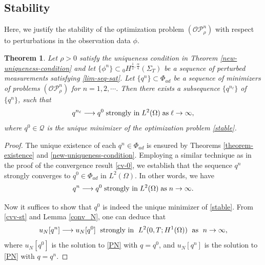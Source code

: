\documentclass[a4paper,12pt,reqno,natbib]{amsart}
\newtheorem{theorem}{Theorem}
\begin{document}
{\color{black}
\subsection{\bf Stability}
Here, we justify the stability of the optimization problem $(\mathcal{O}\mathcal{P}_\rho^n)$ with respect to perturbations in the observation data $\phi$.

\begin{theorem} Let $\rho>0$ satisfy the uniqueness condition in Theorem \ref{new-uniqueness-condition} and let $\{\phi^n\} \subset {}_0H^{\frac{1}{2},\frac{\alpha}{4}}(\Sigma_T)$ be a sequence of perturbed measurements satisfying \eqref{lim-seq-sat}. Let $\{ q^n \}\subset\Phi_{ad}$ be a sequence of minimizers of problems $(\mathcal{O}\mathcal{P}_{\rho}^n)$ for $n=1,2,\cdots$. Then there exists a subsequence $\{ q^{n_\ell} \}$ of $\{ q^n \}$, such that 
\begin{equation*}
q^{n_\ell}\longrightarrow q^0\; \hbox{strongly in}\; L^2(\Omega)\; \hbox{as}\; \ell\rightarrow\infty,
\end{equation*}
where $q^0\in\mathcal{Q}$ is the unique minimizer of the optimization problem \eqref{stable}.
\end{theorem}

\begin{proof}
The unique existence of each $q^n\in\Phi_{ad}$ is ensured by Theorems \ref{theorem-existence} and \ref{new-uniqueness-condition}. Employing a similar technique as in the proof of the convergence result \eqref{cv-0}, we establish that the sequence $q^n$ strongly converges to $q^0\in\Phi_{ad}$ in $L^2(\Omega)$. In other words, we have
\begin{equation}\label{cvv-st}
q^n\longrightarrow q^0\; \hbox{strongly in}\; L^2(\Omega)\; \hbox{as}\; n\rightarrow\infty.
\end{equation}


Now it suffices to show that $q^0$ is indeed the unique minimizer of \eqref{stable}. From \eqref{cvv-st} and Lemma \ref{conv_N}, one can deduce that 
\begin{equation} \label{convergancefaible-NNN}
    u_N[q^n]\longrightarrow u_N[q^0]\; \hbox{ strongly in }\; L^2(0,T;H^1(\Omega))\; \hbox{ as }\; n\to\infty, 
\end{equation}
where $u_N[q^0]$ is the solution to \eqref{PN} with $q=q^0$, and $u_N[q^n]$ is the solution to \eqref{PN} with $q=q^n$.


\end{proof}}
\end{document}
